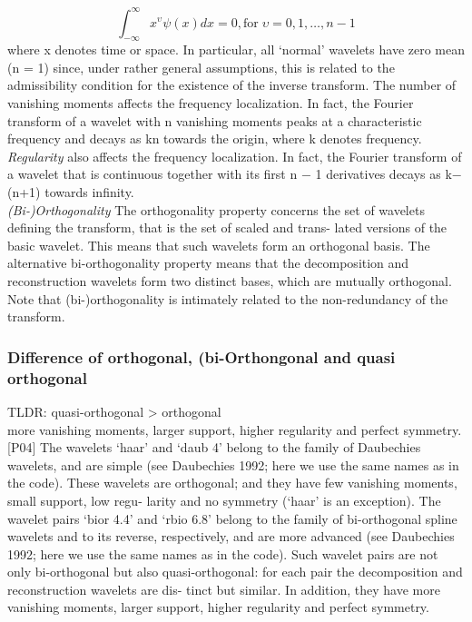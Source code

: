 \documentclass[12pt]{article}
\begin{document}
			\begin{equation}
				\int_{-\infty}^\infty x^\upsilon \psi(x)dx=0, \mathrm{for }\;\upsilon = 0,1, \dots , n −1
			\end{equation}
			where x denotes time or space. In particular, all ‘normal’ wavelets have zero mean (n = 1) since, under rather general assumptions, this is related to the admissibility condition for the existence of the inverse transform. The number of vanishing moments affects the frequency localization. In fact, the Fourier transform of a wavelet with n vanishing moments peaks at a characteristic frequency and decays as kn towards the origin, where k denotes frequency.\\
			\textit{Regularity} also affects the frequency localization. In fact, the Fourier transform of a wavelet that is continuous together with its first n − 1 derivatives decays as k−(n+1) towards infinity.\\
			\textit{(Bi-)Orthogonality} The orthogonality property concerns the set of wavelets defining the transform, that is the set of scaled and trans- lated versions of the basic wavelet. This means that such wavelets form an orthogonal basis. The alternative bi-orthogonality property means that the decomposition and reconstruction wavelets form two distinct bases, which are mutually orthogonal. Note that (bi-)orthogonality is intimately related to the non-redundancy of the transform.

			\subsubsection{Difference of  orthogonal, (bi-Orthongonal and quasi orthogonal}
			TLDR: quasi-orthogonal > orthogonal\\
			more vanishing moments, larger support, higher regularity and perfect symmetry.\\

			[P04]
			 The wavelets ‘haar’ and ‘daub 4’ belong to the family of Daubechies wavelets, and are simple (see Daubechies 1992; here we use the same names as in the code). These wavelets are orthogonal; and they have few vanishing moments, small support, low regu- larity and no symmetry (‘haar’ is an exception). The wavelet pairs ‘bior 4.4’ and ‘rbio 6.8’ belong to the family of bi-orthogonal spline wavelets and to its reverse, respectively, and are more advanced (see Daubechies 1992; here we use the same names as in the code). Such wavelet pairs are not only bi-orthogonal but also quasi-orthogonal: for each pair the decomposition and reconstruction wavelets are dis- tinct but similar. In addition, they have more vanishing moments, larger support, higher regularity and perfect symmetry.
\end{document}
